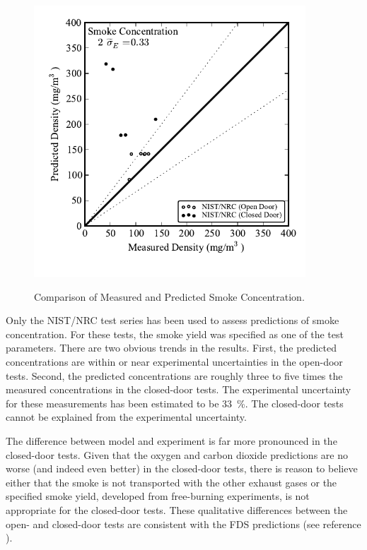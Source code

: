 \begin{figure}
\begin{center}
\includegraphics[width=4.0in]{FIGURES/ScatterPlots/Smoke_Concentration}  \\
\end{center}
\caption{Comparison of Measured and Predicted Smoke Concentration.} \label{fig:Smoke_Scatter}
\end{figure}

Only the NIST/NRC test series has been used to assess predictions of smoke concentration.  For these tests, the smoke yield was specified as one of the test parameters.  There are two obvious trends in the results.  First, the predicted concentrations are within or near experimental uncertainties in the open-door tests.  Second, the predicted concentrations are roughly three to five times the measured concentrations in the closed-door tests.  The experimental uncertainty for these measurements has been estimated to be 33~\%.  The closed-door tests cannot be explained from the experimental uncertainty.

The difference between model and experiment is far more pronounced in the closed-door tests.  Given that the oxygen and carbon dioxide predictions are no worse (and indeed even better) in the closed-door tests, there is reason to believe either that the smoke is not transported with the other exhaust gases or the specified smoke yield, developed from free-burning experiments, is not appropriate for the closed-door tests.  These qualitative differences between the open- and closed-door tests are consistent with the FDS predictions (see reference \cite{NRCNUREG1824_FDS}).


